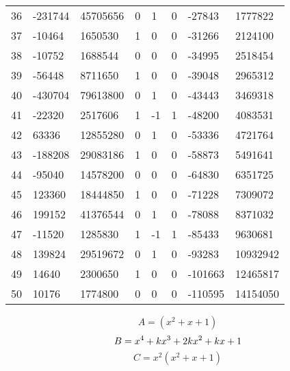 \documentclass{amsart}
\begin{document}
\begin{longtable}{|l|l|l|lllll|}
36&-231744&45705656&0&1&0&-27843&1777822\\
37&-10464&1650530&1&0&0&-31266&2124100\\
38&-10752&1688544&0&0&0&-34995&2518454\\
39&-56448&8711650&1&0&0&-39048&2965312\\
40&-430704&79613800&0&1&0&-43443&3469318\\
41&-22320&2517606&1&-1&1&-48200&4083531\\
42&63336&12855280&0&1&0&-53336&4721764\\
43&-188208&29083186&1&0&0&-58873&5491641\\
44&-95040&14578200&0&0&0&-64830&6351725\\
45&123360&18444850&1&0&0&-71228&7309072\\
46&199152&41376544&0&1&0&-78088&8371032\\
47&-11520&1285830&1&-1&1&-85433&9630681\\
48&139824&29519672&0&1&0&-93283&10932942\\
49&14640&2300650&1&0&0&-101663&12465817\\
50&10176&1774800&0&0&0&-110595&14154050\\
\hline
\end{longtable}
$$A=(x^2
 + x
 + 1)$$
$$B=x^4
 + k\*x^3
 + 2\*k\*x^2
 + k\*x
 + 1$$
$$C=x^2(x^2
 + x
 + 1)$$
\end{document}
